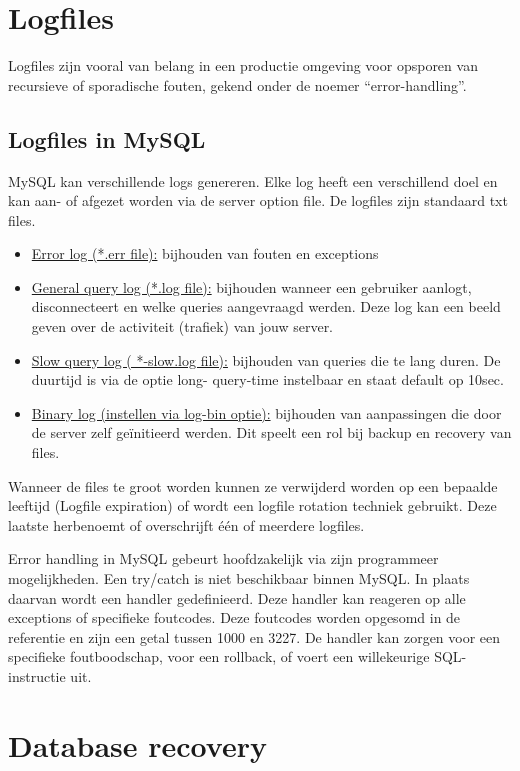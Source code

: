 \documentclass{article}
\begin{document}
\section{Logfiles}

Logfiles zijn vooral van belang in een productie omgeving voor opsporen van recursieve of sporadische fouten,
gekend onder de noemer “error-handling”.

\subsection{Logfiles in MySQL}

MySQL kan verschillende logs genereren. Elke log heeft een verschillend doel en kan aan- of afgezet worden via de
server option file. De logfiles zijn standaard txt files.

\begin{itemize}
\item \underline{Error log (*.err file):} bijhouden van fouten en exceptions
\item \underline{General query log (*.log file):} bijhouden wanneer een gebruiker aanlogt, disconnecteert en welke queries aangevraagd werden. Deze log kan een beeld geven over de activiteit (trafiek) van jouw server.
\item \underline{Slow query log ( *-slow.log file):} bijhouden van queries die te lang duren. De duurtijd is via de optie long- query-time instelbaar en staat default op 10sec.
\item \underline{Binary log (instellen via log-bin optie):} bijhouden van aanpassingen die door de server zelf geïnitieerd werden. Dit speelt een rol bij backup en recovery van files.
\end{itemize}

Wanneer de files te groot worden kunnen ze verwijderd worden op een bepaalde leeftijd (Logfile expiration) of
wordt een logfile rotation techniek gebruikt. Deze laatste herbenoemt of overschrijft één of meerdere logfiles.

Error handling in MySQL gebeurt hoofdzakelijk via zijn programmeer mogelijkheden. Een try/catch is niet
beschikbaar binnen MySQL. In plaats daarvan wordt een handler gedefinieerd. Deze handler kan reageren op alle
exceptions of specifieke foutcodes. Deze foutcodes worden opgesomd in de referentie en zijn een getal tussen 1000
en 3227. De handler kan zorgen voor een specifieke foutboodschap, voor een rollback, of voert een willekeurige SQL-
instructie uit.

\section{Database recovery}
\end{document}
